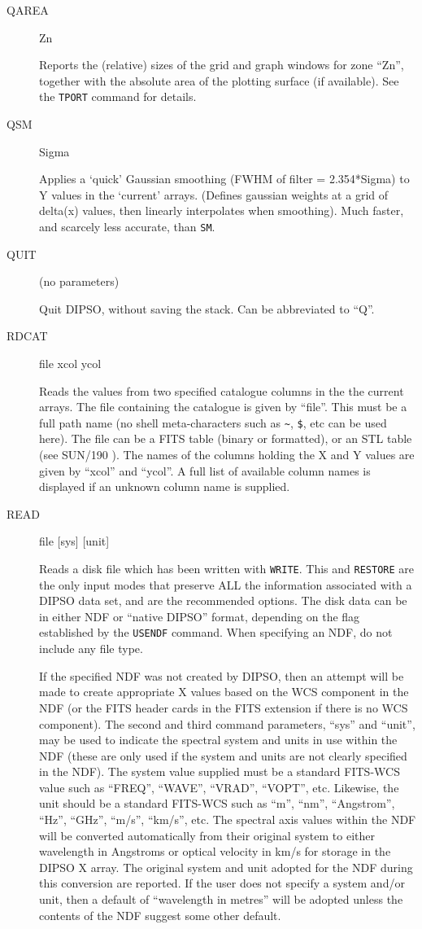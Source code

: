 \documentclass[twoside,11pt]{article}
\newcommand{\htmlref}[2]{#1}
\newcommand{\xref}[3]{#1}
\newcommand{\xlabel}[1]{}
\renewcommand{\_}{\texttt{\symbol{95}}}
\newcommand{\dipcom}[3] { \item [{#1}] {#2} \par }
\newcommand{\dipcom}[3] { \end{description}
                            \subsection{\xlabel{#1}{#1} - {#3}}
                            \label{COM:#1}
                            \begin{description}
                            \item [Syntax:] {\tt{#1} {#2}}
                            \par
                            \item [Description:]}
\begin{document}
\begin {description}
\dipcom{QAREA}{Zn}{Gives information about a plotting zone}
Reports the (relative) sizes of the grid and graph windows for zone
``Zn'', together with the absolute area of the plotting surface (if
available). See the \htmlref{{\tt{TPORT}}}{COM:TPORT}  command for details.

\dipcom{QSM}{Sigma}{Applies a 'quick' Gaussian smoothing to an array}
Applies a `quick' Gaussian smoothing (FWHM of filter = 2.354*Sigma) to
Y values in the `current' arrays. (Defines gaussian weights at a grid
of delta(x) values, then linearly interpolates when smoothing). Much
faster, and scarcely less accurate, than \htmlref{{\tt{SM}}}{COM:SM}. 

\dipcom{QUIT}{(no parameters)}{Quit}
Quit DIPSO, without saving the stack. Can be abbreviated to ``Q''.

\dipcom{RDCAT}{file xcol ycol}{Reads X and Y values from a catalogue into 
the current arrays}
Reads the values from two specified catalogue columns in the the current
arrays. The file containing the catalogue is given by ``file''. This must
be a full path name (no shell meta-characters such as \verb+~+, \verb+$+,
etc can be used here). The file can be a FITS table (binary or formatted), 
or an STL table (see \xref{SUN/190}{sun190}{} ). The names of the columns 
holding the X and Y values are given by ``xcol'' and ``ycol''. A full list 
of available column names is displayed if an unknown column name is supplied.

\dipcom{READ}{file [sys] [unit]}{Reads data from a disk file to the current arrays (see {\tt{WRITE}})} 
Reads a disk file which has been written with 
\htmlref{{\tt{WRITE}}}{COM:WRITE}.  This and \htmlref{{\tt{RESTORE}}}{COM:RESTORE}  
are the
only input modes that preserve ALL the information associated with a DIPSO
data set, and are the recommended options. The disk data can be in either NDF or
``native DIPSO'' format, depending on the flag established by the \htmlref{{\tt{USENDF}}}{COM:USENDF} 
command. When specifying an NDF, do not include any file type.

If the specified NDF was not created by DIPSO, then an attempt will be
made to create appropriate X values based on the WCS component in the
NDF (or the FITS header cards in the FITS extension if there is no WCS
component). The second and third command parameters, ``sys'' and ``unit'',
may be used to indicate the spectral system and units in use within the NDF
(these are only used if the system and units are not clearly specified in
the NDF). The system value supplied must be a standard FITS-WCS value such as 
``FREQ'', ``WAVE'', ``VRAD'', ``VOPT'', etc. Likewise, the unit should be
a standard FITS-WCS such as ``m'', ``nm'', ``Angstrom'', ``Hz'', ``GHz'',
``m/s'', ``km/s'', etc. The spectral axis values within the NDF will be
converted automatically from their original system to either wavelength in 
Angstroms or optical velocity in km/s for storage in the DIPSO X array. The 
original system and unit adopted for the NDF during this conversion are 
reported. If the user does not specify a system and/or unit, then a
default of ``wavelength in metres'' will be adopted unless the contents
of the NDF suggest some other default.


\end{description}
\end{document}
